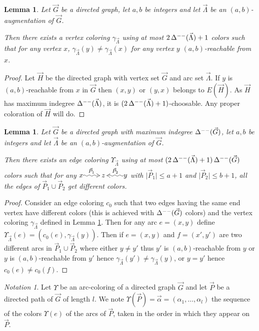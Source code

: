 \documentclass[a4paper]{amsart}
\makeatletter
\newtheorem{lemma}[theorem]{Lemma}
\theoremstyle{definition}
\theoremstyle{remark}
\newtheorem{notation}[definition]{Notation}
\newcommand\vcol[1]{\gamma_{#1}}
\newcommand\ecol[1]{\Upsilon_{#1}}
\newcommand{\card}[1]{\lvert{#1}\rvert}
\DeclareMathOperator\md{\Delta^{\rm --}}
\def\vG{\vec{G}}
\def\vH{\vec{H}}
\def\vP{\vec{P}}
\def\vL{\vec{\Lambda}}
\newcommand{\rdpath}[1]{\xy\xymatrix{*!{}\ar@{~2>}[r]^{#1}&*!{}}\endxy}
\newcommand{\ldpath}[1]{\xy\xymatrix{*!{}&*!{}\ar@{~2>}[l]_{#1}}\endxy}
\newcommand{\lambd}[5]{{#1}\rdpath{#2}{#3}\ldpath{#4}{#5}}
\newcommand{\Lambd}[5]{\xymatrix{&{#3}\\{#1}\ar
    @{~2>}[ur]^{#2}&&{#5}\ar @{~2>}[ul]_{#4}}}
\makeatother
\begin{document}
\begin{lemma}
  \label{lem:vcol}
  Let $\vG$ be a directed graph, let $a,b$ be integers and let
  $\vL$ be an $(a,b)$-augmentation of $\vG$.

  Then there exists a vertex coloring $\vcol{\vL}$ using at most
  $2\md(\vL)+1$ colors such that for any vertex $x$,
  $\vcol{\vL}(y)\neq\vcol{\vL}(x)$ for any vertex $y$ $(a,b)$-reachable from
  $x$.
\end{lemma}
\begin{proof}
  Let $\vH$ be the directed graph with vertex set $\vG$ and arc set
  $\vL$. If $y$ is $(a,b)$-reachable from $x$ in $\vG$ then $(x,y)$
  or $(y,x)$ belongs to $E(\vH)$. As $\vH$ has maximum indegree
  $\md(\vL)$, it is $(2\md(\vL)+1)$-choosable. Any proper
  coloration of $\vH$ will do.
\end{proof}
\begin{lemma}
  \label{lem:ecol}
  Let $\vG$ be a directed graph with maximum indegree $\md(\vG)$, let
  $a,b$ be integers and let $\vL$ be an $(a,b)$-augmentation of $\vG$.

 Then there exists
  an edge coloring $\ecol{\vL}$ using at most $(2\md(\vL)+1)\md(\vG)$
  colors such that for any
$\lambd{x}{\vP_1}{z}{\vP_2}{y}$
 with $\card{\vP_1}\leq a+1$ and $\card{\vP_2}\leq b+1$, 
all the edges of $\vP_1\cup\vP_2$ get different colors.
\end{lemma}
\begin{proof}
  Consider an edge coloring $c_0$ such that two edges having the
  same end vertex have different colors (this is achieved with
  $\md(\vG)$ colors) and the vertex coloring $\vcol{\vL}$ defined in
  Lemma \ref{lem:vcol}.  Then for any arc $e=(x,y)$ define
  $\ecol{\vL}(e)=(c_0(e),\vcol{\vL}(y))$. Then if $e=(x,y)$ and $f=(x',y')$
  are two different arcs in $\vP_1\cup\vP_2$ where
   either $y\neq y'$ thus $y'$ is
  $(a,b)$-reachable from $y$ or $y$ is $(a,b)$-reachable from $y'$
  hence $\vcol{\vL}(y')\neq\vcol{\vL}(y)$, or $y=y'$ hence
  $c_0(e)\neq c_0(f)$.
\end{proof}
\begin{notation}
Let $\Upsilon$ be an arc-coloring of a directed graph $\vG$ and let
$\vP$ be a directed path of $\vG$ of length $l$. 
We note $\Upsilon(\vP)=\vec{\alpha}=(\alpha_1,\dotsc,\alpha_l)$ the
sequence of the colors $\Upsilon(e)$ of the arcs of $\vP$, taken in the
order in which they appear on $\vP$.
\end{notation}
\end{document}
